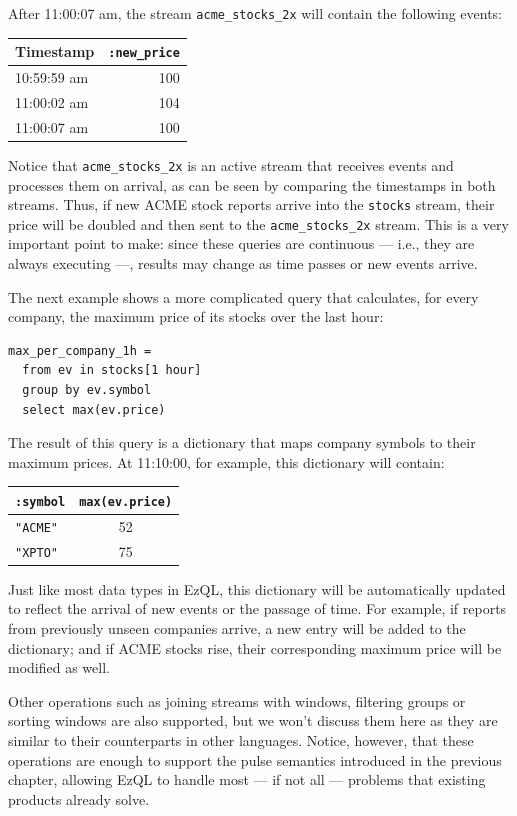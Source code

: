 \documentclass{report}
\begin{document}
After 11:00:07 am, the stream \verb=acme_stocks_2x= will contain the
following events:

\begin{tabular}{ |l|r| }
  \hline
  Timestamp & \verb=:new_price= \\
  \hline
  10:59:59 am & 100 \\
  11:00:02 am & 104 \\
  11:00:07 am & 100 \\
  \hline
\end{tabular}

Notice that \verb=acme_stocks_2x= is an active stream that receives
events and processes them on arrival, as can be seen by comparing the
timestamps in both streams. Thus, if new ACME stock reports arrive
into the \verb=stocks= stream, their price will be doubled and then
sent to the \verb=acme_stocks_2x= stream. This is a very important
point to make: since these queries are continuous --- i.e., they are
always executing ---, results may change as time passes or new events
arrive.

The next example shows a more complicated query that calculates, for
every company, the maximum price of its stocks over the last hour:

\begin{lstlisting}
max_per_company_1h =
  from ev in stocks[1 hour]
  group by ev.symbol
  select max(ev.price)
\end{lstlisting}

The result of this query is a dictionary that maps company symbols to
their maximum prices. At 11:10:00, for example, this dictionary will
contain:

\begin{tabular}{ |l|c| }
  \hline
  \verb=:symbol= & \verb=max(ev.price)= \\
  \hline
  \verb="ACME"= & 52 \\
  \verb="XPTO"= & 75 \\
  \hline
\end{tabular}

Just like most data types in EzQL, this dictionary will be
automatically updated to reflect the arrival of new events or the
passage of time. For example, if reports from previously unseen
companies arrive, a new entry will be added to the dictionary; and if
ACME stocks rise, their corresponding maximum price will be modified
as well.

Other operations such as joining streams with windows, filtering
groups or sorting windows are also supported, but we won't discuss
them here as they are similar to their counterparts in other
languages. Notice, however, that these operations are enough to
support the pulse semantics introduced in the previous chapter,
allowing EzQL to handle most --- if not all --- problems that existing
products already solve.
\end{document}
